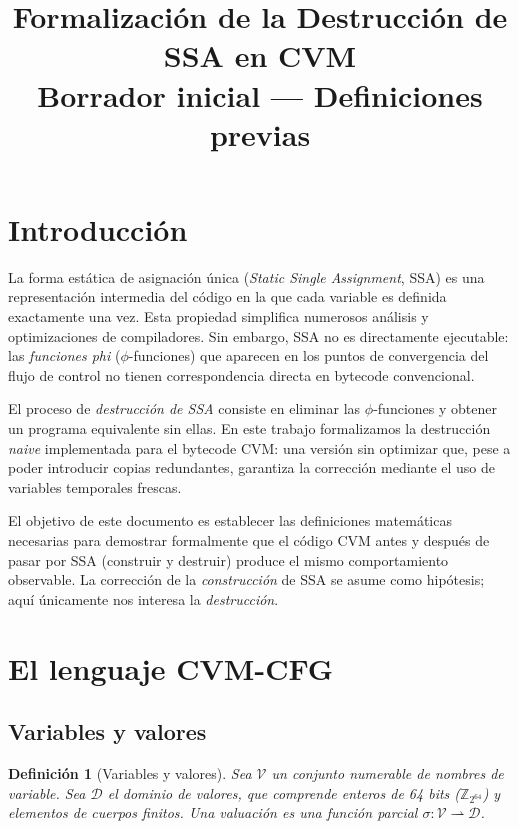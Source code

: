 \documentclass[12pt, a4paper]{article}
\title{Formalización de la Destrucción de SSA en CVM\\[0.5em]
\large Borrador inicial --- Definiciones previas}
\author{}
\date{}
\newtheorem{definition}{Definición}[section]
\begin{document}
\maketitle
\tableofcontents
\newpage

\section{Introducción}

La forma estática de asignación única (\emph{Static Single Assignment}, SSA) es una
representación intermedia del código en la que cada variable es definida exactamente una vez.
Esta propiedad simplifica numerosos análisis y optimizaciones de compiladores. Sin embargo, SSA
no es directamente ejecutable: las \emph{funciones phi} ($\phi$-funciones) que aparecen en los
puntos de convergencia del flujo de control no tienen correspondencia directa en bytecode
convencional.

El proceso de \emph{destrucción de SSA} consiste en eliminar las $\phi$-funciones y obtener un
programa equivalente sin ellas. En este trabajo formalizamos la destrucción \emph{naive}
implementada para el bytecode CVM: una versión sin optimizar que, pese a poder introducir copias
redundantes, garantiza la corrección mediante el uso de variables temporales frescas.

El objetivo de este documento es establecer las definiciones matemáticas necesarias para
demostrar formalmente que el código CVM antes y después de pasar por SSA (construir y destruir)
produce el mismo comportamiento observable. La corrección de la \emph{construcción} de SSA se
asume como hipótesis; aquí únicamente nos interesa la \emph{destrucción}.

\section{El lenguaje CVM-CFG}

\subsection{Variables y valores}

\begin{definition}[Variables y valores]
Sea $\mathcal{V}$ un conjunto numerable de \emph{nombres de variable}. Sea $\mathcal{D}$ el
\emph{dominio de valores}, que comprende enteros de 64 bits ($\mathbb{Z}_{2^{64}}$) y elementos
de cuerpos finitos. Una \emph{valuación} es una función parcial
$\sigma : \mathcal{V} \rightharpoonup \mathcal{D}$.
\end{definition}
\end{document}
